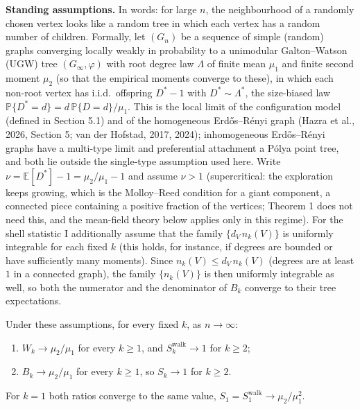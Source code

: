 \documentclass{nws}
\begin{document}
\textbf{Standing assumptions.} In words: for large $n$, the neighbourhood of a randomly chosen vertex looks like a random tree in which each vertex has a random number of children. Formally, let $(G_n)$ be a sequence of simple (random)
graphs converging locally weakly in probability to a unimodular
Galton--Watson (UGW) tree $(G_\infty,\varphi)$ with root degree law $\Lambda$
of finite mean $\mu_1$ and finite second moment $\mu_2$ (so that the empirical
moments converge to these), in which each non-root vertex has i.i.d.\ offspring
$D^*-1$ with $D^*\sim\Lambda^*$, the size-biased law
$\mathbb{P}\{D^*=d\}=d\,\mathbb{P}\{D=d\}/\mu_1$. This is the local limit of
the configuration model (defined in Section 5.1) and of the homogeneous Erd\H{o}s--R\'enyi graph (Hazra
et al., 2026, Section 5; van der Hofstad, 2017, 2024); inhomogeneous
Erd\H{o}s--R\'enyi graphs have a multi-type limit and preferential attachment a
P\'olya point tree, and both lie outside the single-type assumption used here. Write $\nu=\mathbb{E}[D^*]-1=\mu_2/\mu_1-1$ and assume $\nu>1$
(supercritical: the exploration keeps growing, which is the Molloy--Reed condition for a giant component, a connected piece containing a positive fraction of the vertices; Theorem 1 does not need this, and the mean-field theory below applies only in this regime). For
the shell statistic I additionally assume that the family
$\{d_V\,n_k(V)\}$ is uniformly integrable for each fixed $k$ (this holds, for
instance, if degrees are bounded or have sufficiently many moments). Since $n_k(V)\le d_V\,n_k(V)$ (degrees are at least $1$ in a connected graph), the family $\{n_k(V)\}$ is then uniformly integrable as well, so both the numerator and the denominator of $B_k$ converge to their tree expectations.

\begin{proposition}
Under these assumptions, for every fixed $k$, as $n\to\infty$:
\begin{enumerate}
\item[(a)] $W_k\to\mu_2/\mu_1$ for every $k\ge1$, and $S_k^{\mathrm{walk}}\to1$ for $k\ge2$;
\item[(b)] $B_k\to\mu_2/\mu_1$ for every $k\ge1$, so $S_k\to1$ for $k\ge2$.
\end{enumerate}
For $k=1$ both ratios converge to the same value, $S_1=S_1^{\mathrm{walk}}\to\mu_2/\mu_1^2$.
\end{proposition}
\end{document}
